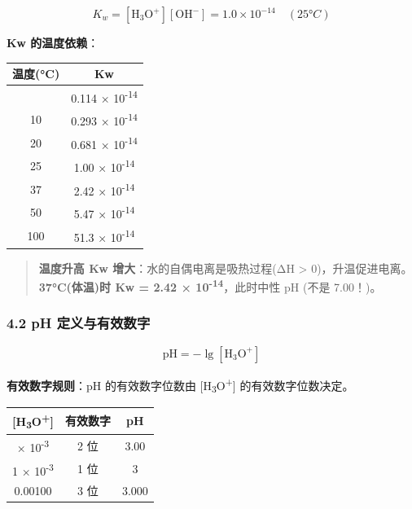 \[
\boxed{K_w = [\mathrm{H_3O^+}][\mathrm{OH^-}] = 1.0 \times 10^{-14} \quad (25°C)}
\]

\textbf{Kw 的温度依赖}：

{\def\LTcaptype{none} %
\begin{longtable}[]{@{}cc@{}}
\toprule\noalign{}
温度(°C) & Kw \\
\midrule\noalign{}
\endhead
\bottomrule\noalign{}
\endlastfoot
0 & 0.114 × 10\textsuperscript{-14} \\
10 & 0.293 × 10\textsuperscript{-14} \\
20 & 0.681 × 10\textsuperscript{-14} \\
25 & 1.00 × 10\textsuperscript{-14} \\
37 & 2.42 × 10\textsuperscript{-14} \\
50 & 5.47 × 10\textsuperscript{-14} \\
100 & 51.3 × 10\textsuperscript{-14} \\
\end{longtable}
}

\begin{quote}
\textbf{温度升高 \箭 Kw 增大}：水的自偶电离是吸热过程(ΔH \textgreater{} 0)，升温促进电离。
\textbf{37°C(体温)时 Kw = 2.42 × 10\textsuperscript{-14}}，此时中性 pH (不是 7.00！)。
\end{quote}

\subsubsection{4.2 pH 定义与有效数字}\label{ph-ux5b9aux4e49ux4e0eux6709ux6548ux6570ux5b57}

\[
\mathrm{pH} = -\lg[\mathrm{H_3O^+}]
\]

\textbf{有效数字规则}：pH 的有效数字位数由 {[}H\textsubscript{3}O\textsuperscript{+}{]} 的有效数字位数决定。

{\def\LTcaptype{none} %
\begin{longtable}[]{@{}ccc@{}}
\toprule\noalign{}
{[}H\textsubscript{3}O\textsuperscript{+}{]} & 有效数字 & pH \\
\midrule\noalign{}
\endhead
\bottomrule\noalign{}
\endlastfoot
1.0 × 10\textsuperscript{-3} & 2 位 & 3.00 \\
1 × 10\textsuperscript{-3} & 1 位 & 3 \\
0.00100 & 3 位 & 3.000 \\
\end{longtable}
}

